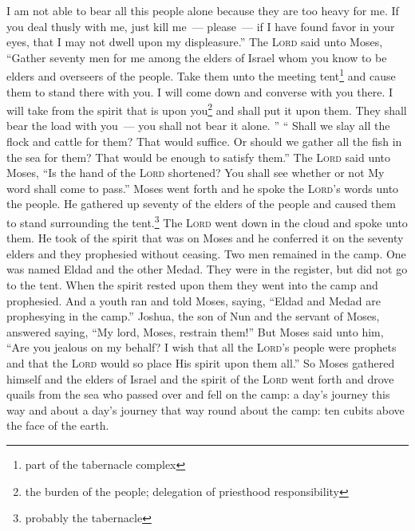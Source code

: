 \begin{enumerate*}[mode=unboxed]
     I am not able to bear all this people alone because they are too heavy for me.%
     If you deal thusly with me, just kill me~--- please~--- if I have found favor in your eyes, that I may not dwell upon my displeasure.''%
     The \textsc{Lord} said unto Moses, ``Gather seventy men for me among the elders of Israel whom you know to be elders and overseers of the people. Take them unto the meeting tent\footnote{part of the tabernacle complex} and cause them to stand there with you.%
     I will come down and converse with you there. I will take from the spirit that is upon you\footnote{the burden of the people; delegation of priesthood responsibility} and shall put it upon them. They shall bear the load with you~--- you shall not bear it alone.%
     ''%
     ``%
     Shall we slay all the flock and cattle for them? That would suffice. Or should we gather all the fish in the sea for them? That would be enough to satisfy them.''%
     The \textsc{Lord} said unto Moses, ``Is the hand of the \textsc{Lord} shortened? You shall see whether or not My word shall come to pass.''%
     Moses went forth and he spoke the \textsc{Lord}'s words unto the people. He gathered up seventy of the elders of the people and caused them to stand surrounding the tent.\footnote{probably the tabernacle}%
     The \textsc{Lord} went down in the cloud and spoke unto them. He took of the spirit that was on Moses and he conferred it on the seventy elders and they prophesied without ceasing.%
     Two men remained in the camp. One was named Eldad and the other Medad. They were in the register, but did not go to the tent. When the spirit rested upon them they went into the camp and prophesied.%
     And a youth ran and told Moses, saying, ``Eldad and Medad are prophesying in the camp.''%
     Joshua, the son of Nun and the servant of Moses, answered saying, ``My lord, Moses, restrain them!''%
     But Moses said unto him, ``Are you jealous on my behalf? I wish that all the \textsc{Lord}'s people were prophets and that the \textsc{Lord} would so place His spirit upon them all.''%
     So Moses gathered himself and the elders of Israel%
     and the spirit of the \textsc{Lord} went forth and drove quails from the sea who passed over and fell on the camp: a day's journey this way and about a day's journey that way round about the camp: ten cubits above the face of the earth.%

\end{enumerate*}
